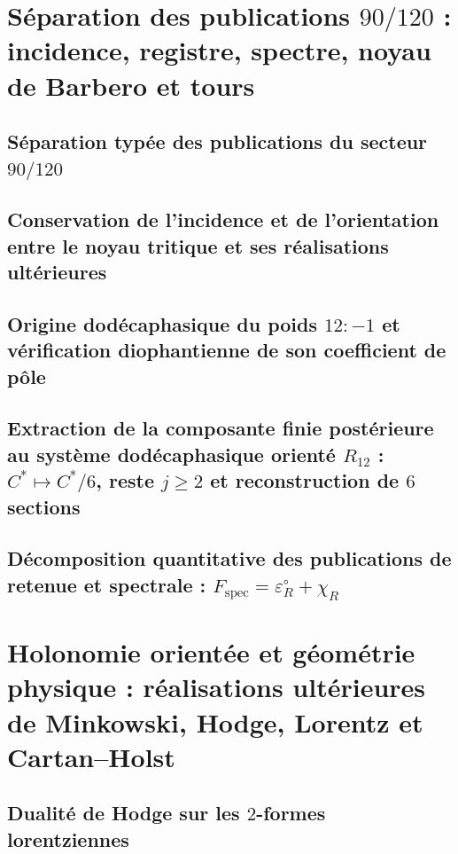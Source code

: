 \section{Séparation des publications \(90/120\) : incidence, registre, spectre, noyau de Barbero et tours}
\subsection{Séparation typée des publications du secteur \(90/120\)}

\subsection{Conservation de l'incidence et de l'orientation entre le noyau tritique et ses réalisations ultérieures}

\subsection{Origine dodécaphasique du poids \(12:-1\) et vérification diophantienne de son coefficient de pôle}

\subsection{Extraction de la composante finie postérieure au système dodécaphasique orienté \(R_{12}\) : \(C^*\mapsto C^*/6\), reste \(j\ge2\) et reconstruction de \(6\) sections}

\subsection{Décomposition quantitative des publications de retenue et spectrale : \(F_{\mathrm{spec}}=\varepsilon_R^\circ+\chi_R\)}


\section{Holonomie orientée et géométrie physique : réalisations ultérieures de Minkowski, Hodge, Lorentz et Cartan--Holst}

\subsection{Dualité de Hodge sur les \(2\)-formes lorentziennes}

